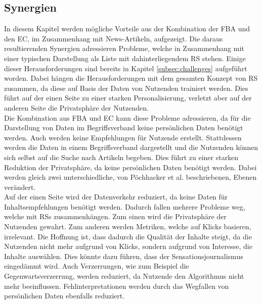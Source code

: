 \subsection{Synergien}\label{subsec:synergies}
In diesem Kapitel werden mögliche Vorteile aus der Kombination der \ac{FBA} und den \ac{EC}, im Zusammenhang mit News-Artikeln, aufgezeigt.
Die daraus resultierenden Synergien adressieren Probleme, welche in Zusammenhang mit einer typischen Darstellung als Liste mit dahinterliegendem \ac{RS} stehen.
Einige dieser Herausforderungen sind bereits in Kapitel \ref{subsec:challenges} aufgeführt worden.
Dabei hängen die Herausforderungen mit dem gesamten Konzept von \ac{RS} zusammen, da diese auf Basis der Daten von Nutzenden trainiert werden.
Dies führt auf der einen Seite zu einer starken Personalisierung, verletzt aber auf der anderen Seite die Privatsphäre der Nutzenden.\\

Die Kombination aus \ac{FBA} und \ac{EC} kann diese Probleme adressieren, da für die Darstellung von Daten im Begriffsverband keine persönlichen Daten benötigt werden.
Auch werden keine Empfehlungen für Nutzende erstellt.
Stattdessen werden die Daten in einem Begriffsverband dargestellt und die Nutzenden können sich selbst auf die Suche nach Artikeln begeben.
Dies führt zu einer starken Reduktion der Privatsphäre, da keine persönlichen Daten benötigt werden.
Dabei werden gleich zwei unterschiedliche, von Pöchhacker et al. beschriebenen, Ebenen verändert.\\

Auf der einen Seite wird der Datenverkehr reduziert, da keine Daten für Inhaltsempfehlungen benötigt werden.
Dadurch fallen mehrere Probleme weg, welche mit \acp{RS} zusammenhängen.
Zum einen wird die Privatsphäre der Nutzenden gewahrt.
Zum anderen werden Metriken, welche auf Klicks basieren, irrelevant.
Die Hoffnung ist, dass dadurch die Qualität der Inhalte steigt, da die Nutzenden nicht mehr aufgrund von Klicks, sondern aufgrund von Interesse, die Inhalte auswählen.
Dies könnte dazu führen, dass der Sensationsjournalismus eingedämmt wird.
Auch Verzerrungen, wie zum Beispiel die Gegenwartsverzerrung, werden reduziert, da Nutzende den Algorithmus nicht mehr beeinflussen.
Fehlinterpretationen werden durch das Wegfallen von persönlichen Daten ebenfalls reduziert. \\

